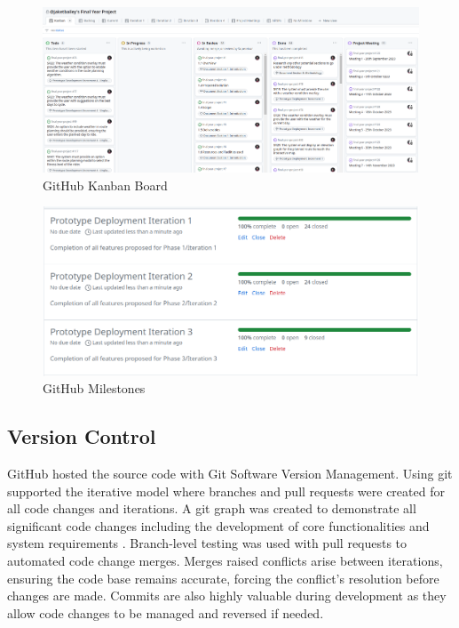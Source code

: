 \newpage
\begin{landscape}
\begin{figure}
    \centering
    \includegraphics[width=700px]{figures/kanban.png}
    \caption{GitHub Kanban Board}
    \label{fig:kanban}
\end{figure}
\newpage

\begin{figure}
    \centering
    \includegraphics[width=700px]{figures/milestones.png}
    \caption{GitHub Milestones}
    \label{fig:milestones}
\end{figure}
\newpage
\end{landscape}

\subsection{Version Control}
\label{pm:version_control}

GitHub hosted the source code with Git Software Version Management. Using git supported the iterative model where branches and pull requests were created for all code changes and iterations. A git graph was created to demonstrate all significant code changes including the development of core functionalities and system requirements . Branch-level testing was used with pull requests to automated code change merges. Merges raised conflicts arise between iterations, ensuring the code base remains accurate, forcing the conflict's resolution before changes are made. Commits are also highly valuable during development as they allow code changes to be managed and reversed if needed. 

